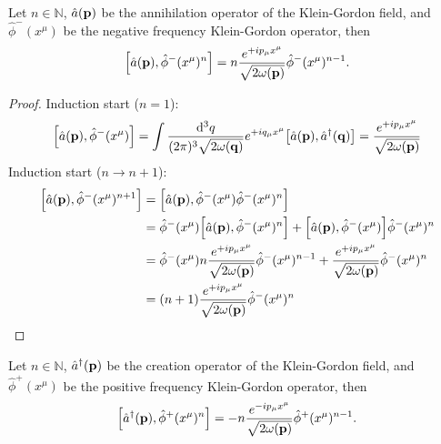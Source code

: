 \begin{lemma}\label{thm:qkg_comm_an}
	Let $n\in\mathbb{N}$, $\hat{a}(\vb{p})$ be the annihilation operator of the Klein-Gordon field, and $\hat\phi^-(x^\mu)$ be the negative frequency Klein-Gordon operator, then
	\begin{equation}
		\comm{\hat{a}(\vb{p})}{\hat\phi^-(x^\mu)^n}
		=
		n
		\frac{e^{+ip_\mu x^\mu}}{\sqrt{2\omega(\vb{p})}}
		\hat\phi^-(x^\mu)^{n-1}
		\label{eq:qkg_comm_an}
		.
	\end{equation}
\end{lemma}
\begin{proof}
	Induction start ($n=1$):
	\begin{equation*}
		\comm{\hat{a}(\vb{p})}{\hat\phi^-(x^\mu)}
		=
		\int\frac{\dd[3]{q}}{(2\pi)^3\sqrt{2\omega(\vb{q})}}
		e^{+iq_\mu x^\mu}
		\comm{\hat{a}(\vb{p})}{\hat{a}^\dagger(\vb{q})}
		=
		\frac{e^{+ip_\mu x^\mu}}{\sqrt{2\omega(\vb{p})}}
	\end{equation*}
	Induction start ($n\to n+1$):
	\begin{equation*}
		\begin{split}
			\comm{\hat{a}(\vb{p})}{\hat\phi^-(x^\mu)^{n+1}}
			&=
			\comm{\hat{a}(\vb{p})}{\hat\phi^-(x^\mu)\hat\phi^-(x^\mu)^n}
			\\
			&=
			\hat\phi^-(x^\mu)
			\comm{\hat{a}(\vb{p})}{\hat\phi^-(x^\mu)^n}
			+
			\comm{\hat{a}(\vb{p})}{\hat\phi^-(x^\mu)}
			\hat\phi^-(x^\mu)^n
			\\
			&=
			\hat\phi^-(x^\mu)
			n
			\frac{e^{+ip_\mu x^\mu}}{\sqrt{2\omega(\vb{p})}}
			\hat\phi^-(x^\mu)^{n-1}
			+
			\frac{e^{+ip_\mu x^\mu}}{\sqrt{2\omega(\vb{p})}}
			\hat\phi^-(x^\mu)^n
			\\
			&=
			(n+1)
			\frac{e^{+ip_\mu x^\mu}}{\sqrt{2\omega(\vb{p})}}
			\hat\phi^-(x^\mu)^n
		\end{split}
	\end{equation*}
\end{proof}
\begin{lemma}\label{thm:qkg_comm_cp}
	Let $n\in\mathbb{N}$, $\hat{a}^\dagger(\vb{p})$ be the creation operator of the Klein-Gordon field, and $\hat\phi^+(x^\mu)$ be the positive frequency Klein-Gordon operator, then
	\begin{equation}
		\comm{\hat{a}^\dagger(\vb{p})}{\hat\phi^+(x^\mu)^n}
		=
		-
		n
		\frac{e^{-ip_\mu x^\mu}}{\sqrt{2\omega(\vb{p})}}
		\hat\phi^+(x^\mu)^{n-1}
		\label{eq:qkg_comm_cp}
		.
	\end{equation}
\end{lemma}

